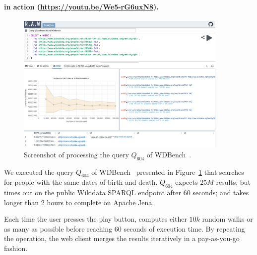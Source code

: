 \paragraph{\NAME in action (\url{https://youtu.be/We5-rG6uxN8}).}


 \begin{figure}
   \centering
   \includegraphics[width=0.91\textwidth]{figures/raw_screenshot.png}
   \caption{\label{fig:raw_screenshot} Screenshot of \NAME processing the query $Q_{604}$ of
     WDBench~\cite{angles2022wdbench}.}
 \end{figure}

We executed the query
$Q_{604}$ of WDBench~\cite{angles2022wdbench} presented in
Figure~\ref{fig:raw_screenshot} that searches for people with the same
dates of birth and death. $Q_{604}$ expects $25M$ results, but times
out on the public Wikidata SPARQL endpoint after $60$ seconds; and
takes longer than $2$ hours to complete on Apache Jena.


\noindent Each time the user presses the play button, \NAME computes
either $10k$ random walks or as many as possible before reaching $60$
seconds of execution time. By repeating the operation, the web client
merges the results iteratively in a pay-as-you-go fashion.


